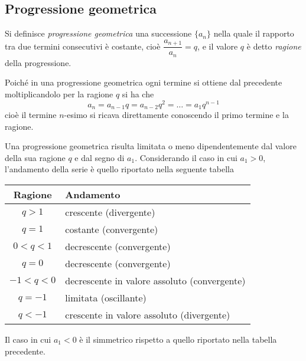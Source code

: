 \ovalbox{\ref{ese:8a_progr.11}, \ref{ese:8a_progr.12}, \ref{ese:8a_progr.13}, \ref{ese:8a_progr.14}, \ref{ese:8a_progr.15}, \ref{ese:8a_progr.16}, \ref{ese:8a_progr.17}, \ref{ese:8a_progr.18}, \ref{ese:8a_progr.19}, \ref{ese:8a_progr.20}, \ref{ese:8a_progr.21}}


\subsection{Progressione geometrica}

\begin{definizione}
Si definisce \emph{progressione geometrica} una successione $\{a_n\}$ nella quale il rapporto tra due termini consecutivi è costante, cioè $\dfrac{a_{n+1}}{a_n} = q$, e il valore $q$ è detto \emph{ragione} della progressione.
\end{definizione}

Poiché in una progressione geometrica ogni termine si ottiene dal precedente moltiplicandolo per la ragione $q$ si ha che
\[a_n = a_{n-1}q = a_{n-2}q^2 = \ldots = a_1 q^{n-1}\]
cioè il termine $n$-esimo si ricava direttamente conoscendo il primo termine e la ragione.

Una progressione geometrica risulta limitata o meno dipendentemente dal valore della sua ragione $q$ e dal segno di $a_1$. Considerando il caso in cui $a_1>0$, l'andamento della serie è quello riportato nella seguente tabella
\begin{center}
\begin{tabular}{cl}
\toprule
Ragione & Andamento\\
\midrule
$q>1$ & crescente (divergente)\\
$q=1$ & costante (convergente)\\
$0<q<1$ & decrescente (convergente)\\
$q=0$ & decrescente (convergente)\\
$-1<q<0$ & decrescente in valore assoluto (convergente)\\
$q=-1$ & limitata (oscillante)\\
$q<-1$ & crescente in valore assoluto (divergente)\\
\bottomrule
\end{tabular}
\end{center}
Il caso in cui $a_1<0$ è il simmetrico rispetto a quello riportato nella tabella precedente.

